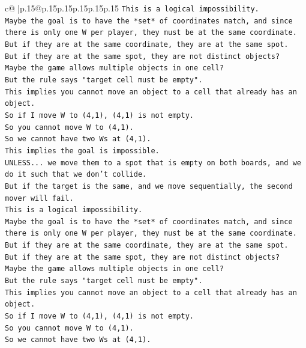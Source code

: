 \documentclass{article}
\begin{document}
{\begin{supertabular}{c@{$\;$}|p{.15\linewidth}@{}p{.15\linewidth}p{.15\linewidth}p{.15\linewidth}p{.15\linewidth}p{.15\linewidth}}
{{{\texttt{This is a logical impossibility.} \\
\texttt{Maybe the goal is to have the *set* of coordinates match, and since there is only one W per player, they must be at the same coordinate.} \\
\texttt{But if they are at the same coordinate, they are at the same spot.} \\
\texttt{But if they are at the same spot, they are not distinct objects?} \\
\texttt{Maybe the game allows multiple objects in one cell?} \\
\texttt{But the rule says "target cell must be empty".} \\
\texttt{This implies you cannot move an object to a cell that already has an object.} \\
\texttt{So if I move W to (4,1), (4,1) is not empty.} \\
\texttt{So you cannot move W to (4,1).} \\
\texttt{So we cannot have two Ws at (4,1).} \\
\texttt{This implies the goal is impossible.} \\
\texttt{UNLESS... we move them to a spot that is empty on both boards, and we do it such that we don't collide.} \\
\texttt{But if the target is the same, and we move sequentially, the second mover will fail.} \\
\texttt{This is a logical impossibility.} \\
\texttt{Maybe the goal is to have the *set* of coordinates match, and since there is only one W per player, they must be at the same coordinate.} \\
\texttt{But if they are at the same coordinate, they are at the same spot.} \\
\texttt{But if they are at the same spot, they are not distinct objects?} \\
\texttt{Maybe the game allows multiple objects in one cell?} \\
\texttt{But the rule says "target cell must be empty".} \\
\texttt{This implies you cannot move an object to a cell that already has an object.} \\
\texttt{So if I move W to (4,1), (4,1) is not empty.} \\
\texttt{So you cannot move W to (4,1).} \\
\texttt{So we cannot have two Ws at (4,1).} \\
}}}
\end{supertabular}}
\end{document}
